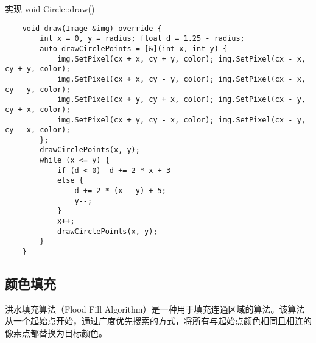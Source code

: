 \documentclass[a4paper,twoside]{article}
\begin{document}
\begin{listing}[H]
    \caption{实现 void Circle::draw()}
    \label{code:circle_draw}
    \begin{verbatim}
    void draw(Image &img) override {
        int x = 0, y = radius; float d = 1.25 - radius;
        auto drawCirclePoints = [&](int x, int y) {
            img.SetPixel(cx + x, cy + y, color); img.SetPixel(cx - x, cy + y, color);
            img.SetPixel(cx + x, cy - y, color); img.SetPixel(cx - x, cy - y, color);
            img.SetPixel(cx + y, cy + x, color); img.SetPixel(cx - y, cy + x, color);
            img.SetPixel(cx + y, cy - x, color); img.SetPixel(cx - y, cy - x, color);
        };
        drawCirclePoints(x, y);
        while (x <= y) {
            if (d < 0)  d += 2 * x + 3
            else { 
                d += 2 * (x - y) + 5;
                y--;
            }
            x++;
            drawCirclePoints(x, y);
        }
    }
    \end{verbatim}
\end{listing}
\subsection{颜色填充}
洪水填充算法（Flood Fill Algorithm）是一种用于填充连通区域的算法。该算法从一个起始点开始，通过广度优先搜索的方式，将所有与起始点颜色相同且相连的像素点都替换为目标颜色。
\end{document}
